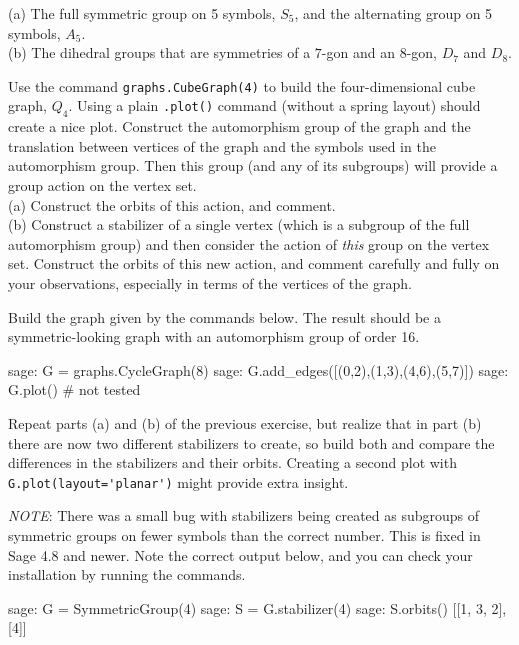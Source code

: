 (a) The full symmetric group on 5 symbols, $S_5$, and the alternating group on 5 symbols, $A_5$.\\
(b) The dihedral groups that are symmetries of a $7$-gon and an $8$-gon, $D_{7}$ and $D_{8}$.
\begin{sageverbatim}\end{sageverbatim}
%
%
Use the command \verb?graphs.CubeGraph(4)? to build the four-dimensional cube graph, $Q_4$.  Using a plain \verb?.plot()? command (without a spring layout) should create a nice plot.  Construct the automorphism group of the graph and the translation between vertices of the graph and the symbols used in the automorphism group.  Then this group (and any of its subgroups) will provide a group action on the vertex set.\\
%
(a) Construct the orbits of this action, and comment.\\
(b) Construct a stabilizer of a single vertex (which is a subgroup of the full automorphism group) and then consider the action of \emph{this} group on the vertex set.  Construct the orbits of this new action, and comment carefully and fully on your observations, especially in terms of the vertices of the graph.
\begin{sageverbatim}\end{sageverbatim}
%
%
Build the graph given by the commands below.  The result should be a symmetric-looking graph with an automorphism group of order 16.
%
%
\begin{sageexample}
sage: G = graphs.CycleGraph(8)
sage: G.add_edges([(0,2),(1,3),(4,6),(5,7)])
sage: G.plot()                  # not tested
\end{sageexample}
%
Repeat parts (a) and (b) of the previous exercise, but realize that in part (b) there are now two different stabilizers to create, so build both and compare the differences in the stabilizers and their orbits.  Creating a second plot with \verb?G.plot(layout='planar')? might provide extra insight.\par
%
\emph{NOTE}: There was a small bug with stabilizers being created as subgroups of symmetric groups on fewer symbols than the correct number.  This is fixed in Sage 4.8 and newer.  Note the correct output below, and you can check your installation by running the commands.
%
\begin{sageexample}
sage: G = SymmetricGroup(4)
sage: S = G.stabilizer(4)
sage: S.orbits()
[[1, 3, 2], [4]]
\end{sageexample}
%

